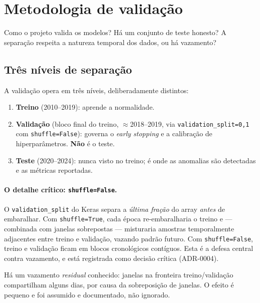 \section{Metodologia de validação}
\label{sec:debate-valid}

\begin{confronto}
Como o projeto valida os modelos? Há um conjunto de teste honesto? A separação
respeita a natureza temporal dos dados, ou há vazamento?
\end{confronto}

\subsection{Três níveis de separação}
A validação opera em três níveis, deliberadamente distintos:

\begin{enumerate}[noitemsep]
  \item \textbf{Treino} (2010--2019): aprende a normalidade.
  \item \textbf{Validação} (bloco final do treino, $\approx$2018--2019, via
        \texttt{validation\_split=0,1} com \texttt{shuffle=False}): governa o
        \emph{early stopping} e a calibração de hiperparâmetros. \textbf{Não} é o
        teste.
  \item \textbf{Teste} (2020--2024): nunca visto no treino; é onde as anomalias
        são detectadas e as métricas reportadas.
\end{enumerate}

\paragraph{O detalhe crítico: \texttt{shuffle=False}.}
O \texttt{validation\_split} do Keras separa a \emph{última fração} do array
\emph{antes} de embaralhar. Com \texttt{shuffle=True}, cada época re-embaralharia
o treino e --- combinada com janelas sobrepostas --- misturaria amostras
temporalmente adjacentes entre treino e validação, vazando padrão futuro. Com
\texttt{shuffle=False}, treino e validação ficam em blocos cronológicos
contíguos. Esta é a defesa central contra vazamento, e está registrada como
decisão crítica (ADR-0004).

\begin{honesto}
Há um vazamento \emph{residual} conhecido: janelas na fronteira treino/validação
compartilham alguns dias, por causa da sobreposição de janelas. O efeito é
pequeno e foi assumido e documentado, não ignorado.
\end{honesto}

